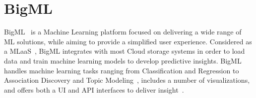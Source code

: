 \section{BigML}

BigML~\cite{hid-sp18-504-cloudacad-bigml} is a Machine Learning platform
focused on delivering a wide range of ML solutions, while aiming to provide
a simplified user experience.
Considered as a MLaaS~\cite{hid-sp18-504-cloudacad-bigml}, BigML integrates
with most Cloud storage systems in order to load data and train machine
learning models to develop predictive insights. BigML handles machine
learning tasks ranging from Classification and Regression to
Association Discovery and Topic Modeling~\cite{hid-sp18-504-bigml},
includes a number of visualizations, and offers both a UI and API
interfaces to deliver insight~\cite{hid-sp18-504-cloudacad-bigml}.
